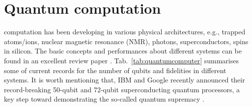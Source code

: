 %
%

\section{Quantum computation}

 computation has been developing in various physical architectures, e.g., trapped atoms/ions, nuclear magnetic resonance (NMR), photons, superconductors, spins in silicon. The basic concepts and performances about different systems can be found in an excellent review paper \cite{bib:ladd2010quantum}. Tab.~\ref{tab:quantumcomputer} summarises some of current records for the number of qubits and fidelities in different systems. It is worth mentioning that, IBM and Google recently announced their record-breaking 50-qubit and 72-qubit superconducting quantum processors, a key step toward demonstrating the so-called quantum supremacy \cite{bib:savage2018quantum, bib:neill2018blueprint, bib:harrow2017quantum}.


